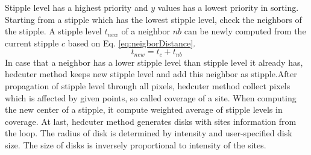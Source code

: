 \documentclass[11pt]{article}
\begin{document}
Stipple level has a highest priority and $y$ values has a lowest priority in sorting.
Starting from a stipple which has the lowest stipple level, check the neighbors of the stipple.
A stipple level $t_{new}$ of a neighbor $nb$ can be newly computed from the current stipple $c$ based on Eq. \ref{eq:neigborDistance}.
\begin{equation}\label{eq:neigborDistance}
t_{new}=t_{c} + t_{nb}
\end{equation}
In case that a neighbor has a lower stipple level than stipple level it already has, hedcuter method keeps new stipple level and add this neighbor as stipple.After propagation of stipple level through all pixels, hedcuter method collect pixels which is affected by given points, so called coverage of a site. When computing the new center of a stipple, it compute weighted average of stipple levels in coverage.
At last, hedcuter method generates disks with sites information from the loop. The radius of disk is determined by intensity and user-specified disk size. The size of disks is inversely proportional to intensity of the sites. 

\end{document}
